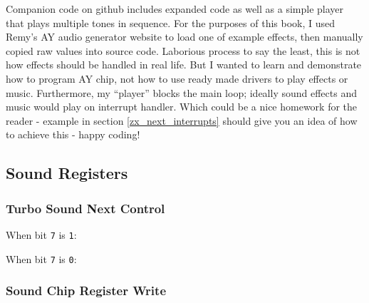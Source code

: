 \documentclass[12pt,twoside,openright,a4paper]{book}
\begin{document}
Companion code on github includes expanded code as well as a simple player that plays multiple tones in sequence. For the purposes of this book, I used Remy's AY audio generator website to load one of example effects, then manually copied raw values into source code. Laborious process to say the least, this is not how effects should be handled in real life. But I wanted to learn and demonstrate how to program AY chip, not how to use ready made drivers to play effects or music. Furthermore, my ``player'' blocks the main loop; ideally sound effects and music would play on interrupt handler. Which could be a nice homework for the reader - example in section \ref{zx_next_interrupts} should give you an idea of how to achieve this - happy coding!


\pagebreak
\subsection{Sound Registers}

\subsubsection{Turbo Sound Next Control }

When bit {\tt 7} is {\tt 1}:

\begin{NextPort}
\end{NextPort}

When bit {\tt 7} is {\tt 0}:

\begin{NextPort}
\end{NextPort}


\subsubsection{Sound Chip Register Write }
\end{document}
